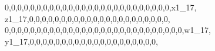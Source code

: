 \documentclass[]{article}
\newenvironment{Shaded}{\begin{snugshade}}{\end{snugshade}}
\newcommand{\DecValTok}[1]{\textcolor[rgb]{0.00,0.00,0.81}{#1}}
\newcommand{\NormalTok}[1]{#1}
\begin{document}
\begin{Shaded}
\begin{Highlighting}[]
\DecValTok{0}\NormalTok{,}\DecValTok{0}\NormalTok{,}\DecValTok{0}\NormalTok{,}\DecValTok{0}\NormalTok{,}\DecValTok{0}\NormalTok{,}\DecValTok{0}\NormalTok{,}\DecValTok{0}\NormalTok{,}\DecValTok{0}\NormalTok{,}\DecValTok{0}\NormalTok{,}\DecValTok{0}\NormalTok{,}\DecValTok{0}\NormalTok{,}\DecValTok{0}\NormalTok{,}\DecValTok{0}\NormalTok{,}\DecValTok{0}\NormalTok{,}\DecValTok{0}\NormalTok{,}\DecValTok{0}\NormalTok{,}\DecValTok{0}\NormalTok{,}\DecValTok{0}\NormalTok{,}\DecValTok{0}\NormalTok{,}\DecValTok{0}\NormalTok{,}\DecValTok{0}\NormalTok{,}\DecValTok{0}\NormalTok{,}\DecValTok{0}\NormalTok{,}\DecValTok{0}\NormalTok{,}\DecValTok{0}\NormalTok{,}\DecValTok{0}\NormalTok{,x1_}\DecValTok{17}\NormalTok{, z1_}\DecValTok{17}\NormalTok{,}\DecValTok{0}\NormalTok{,}\DecValTok{0}\NormalTok{,}\DecValTok{0}\NormalTok{,}\DecValTok{0}\NormalTok{,}\DecValTok{0}\NormalTok{,}\DecValTok{0}\NormalTok{,}\DecValTok{0}\NormalTok{,}\DecValTok{0}\NormalTok{,}\DecValTok{0}\NormalTok{,}\DecValTok{0}\NormalTok{,}\DecValTok{0}\NormalTok{,}\DecValTok{0}\NormalTok{,}\DecValTok{0}\NormalTok{,}\DecValTok{0}\NormalTok{,}\DecValTok{0}\NormalTok{,}\DecValTok{0}\NormalTok{,}\DecValTok{0}\NormalTok{,}\DecValTok{0}\NormalTok{,}\DecValTok{0}\NormalTok{,}\DecValTok{0}\NormalTok{,}\DecValTok{0}\NormalTok{,}\DecValTok{0}\NormalTok{,}
\DecValTok{0}\NormalTok{,}\DecValTok{0}\NormalTok{,}\DecValTok{0}\NormalTok{,}\DecValTok{0}\NormalTok{,}\DecValTok{0}\NormalTok{,}\DecValTok{0}\NormalTok{,}\DecValTok{0}\NormalTok{,}\DecValTok{0}\NormalTok{,}\DecValTok{0}\NormalTok{,}\DecValTok{0}\NormalTok{,}\DecValTok{0}\NormalTok{,}\DecValTok{0}\NormalTok{,}\DecValTok{0}\NormalTok{,}\DecValTok{0}\NormalTok{,}\DecValTok{0}\NormalTok{,}\DecValTok{0}\NormalTok{,}\DecValTok{0}\NormalTok{,}\DecValTok{0}\NormalTok{,}\DecValTok{0}\NormalTok{,}\DecValTok{0}\NormalTok{,}\DecValTok{0}\NormalTok{,}\DecValTok{0}\NormalTok{,}\DecValTok{0}\NormalTok{,}\DecValTok{0}\NormalTok{,}\DecValTok{0}\NormalTok{,}\DecValTok{0}\NormalTok{,}\DecValTok{0}\NormalTok{,}\DecValTok{0}\NormalTok{,w1_}\DecValTok{17}\NormalTok{, y1_}\DecValTok{17}\NormalTok{,}\DecValTok{0}\NormalTok{,}\DecValTok{0}\NormalTok{,}\DecValTok{0}\NormalTok{,}\DecValTok{0}\NormalTok{,}\DecValTok{0}\NormalTok{,}\DecValTok{0}\NormalTok{,}\DecValTok{0}\NormalTok{,}\DecValTok{0}\NormalTok{,}\DecValTok{0}\NormalTok{,}\DecValTok{0}\NormalTok{,}\DecValTok{0}\NormalTok{,}\DecValTok{0}\NormalTok{,}\DecValTok{0}\NormalTok{,}\DecValTok{0}\NormalTok{,}\DecValTok{0}\NormalTok{,}\DecValTok{0}\NormalTok{,}\DecValTok{0}\NormalTok{,}\DecValTok{0}\NormalTok{,}\DecValTok{0}\NormalTok{,}\DecValTok{0}\NormalTok{,}

\end{Highlighting}
\end{Shaded}
\end{document}
